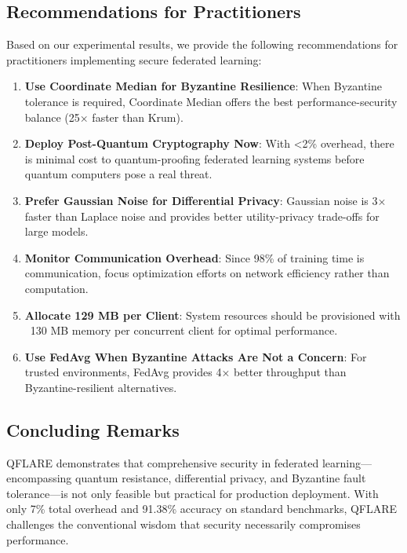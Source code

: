 \documentclass[12pt,a4paper]{article}
\begin{document}
\subsection{Recommendations for Practitioners}

Based on our experimental results, we provide the following recommendations for practitioners implementing secure federated learning:

\begin{enumerate}
    \item \textbf{Use Coordinate Median for Byzantine Resilience}: When Byzantine tolerance is required, Coordinate Median offers the best performance-security balance (25× faster than Krum).
    
    \item \textbf{Deploy Post-Quantum Cryptography Now}: With <2\% overhead, there is minimal cost to quantum-proofing federated learning systems before quantum computers pose a real threat.
    
    \item \textbf{Prefer Gaussian Noise for Differential Privacy}: Gaussian noise is 3× faster than Laplace noise and provides better utility-privacy trade-offs for large models.
    
    \item \textbf{Monitor Communication Overhead}: Since 98\% of training time is communication, focus optimization efforts on network efficiency rather than computation.
    
    \item \textbf{Allocate 129 MB per Client}: System resources should be provisioned with ~130 MB memory per concurrent client for optimal performance.
    
    \item \textbf{Use FedAvg When Byzantine Attacks Are Not a Concern}: For trusted environments, FedAvg provides 4× better throughput than Byzantine-resilient alternatives.
\end{enumerate}

\subsection{Concluding Remarks}

QFLARE demonstrates that comprehensive security in federated learning---encompassing quantum resistance, differential privacy, and Byzantine fault tolerance---is not only feasible but practical for production deployment. With only 7\% total overhead and 91.38\% accuracy on standard benchmarks, QFLARE challenges the conventional wisdom that security necessarily compromises performance.
\end{document}
